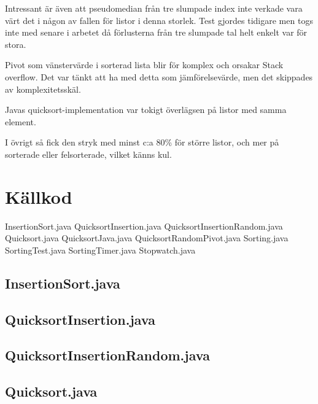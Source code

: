 \documentclass[a4paper,10pt,twoside]{article}
\begin{document}
Intressant är även att pseudomedian från tre slumpade index inte verkade vara värt det i någon av fallen för listor i denna storlek. Test gjordes tidigare men togs inte med senare i arbetet då förlusterna från tre slumpade tal helt enkelt var för stora.

Pivot som vänstervärde i sorterad lista blir för komplex och orsakar Stack overflow. Det var tänkt att ha med detta som jämförelsevärde, men det skippades av komplexitetsskäl.

Javas quicksort-implementation var tokigt överlägsen på listor med samma element.

I övrigt så fick den stryk med minst c:a 80\% för större listor, och mer på sorterade eller felsorterade, vilket känns kul.

\clearpage

\appendix

\section{Källkod}

InsertionSort.java
QuicksortInsertion.java
QuicksortInsertionRandom.java
Quicksort.java
QuicksortJava.java
QuicksortRandomPivot.java
Sorting.java
SortingTest.java
SortingTimer.java
Stopwatch.java

\subsection{InsertionSort.java}


\subsection{QuicksortInsertion.java}


\subsection{QuicksortInsertionRandom.java}


\subsection{Quicksort.java}

\end{document}
